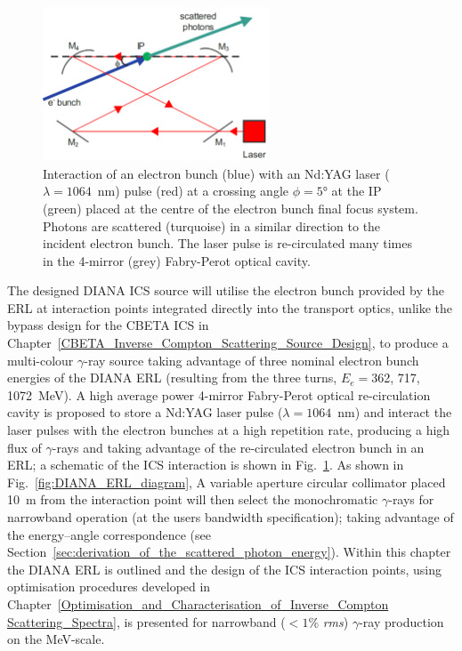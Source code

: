 \documentclass[../main.tex]{subfiles}
\begin{document}
\begin{figure}[!h]
\centering
\includegraphics[width=0.6\textwidth]{Figures/DIANA_Inverse_Compton_Source_Design/DIANA_interaction_fixed.pdf}
\caption{Interaction of an electron bunch (blue) with an Nd:YAG laser ($\lambda = 1064$~\si{\nano\meter}) pulse (red) at a crossing angle $\phi=5$\si{\degree} at the IP (green) placed at the centre of the electron bunch final focus system. Photons are scattered (turquoise) in a similar direction to the incident electron bunch. The laser pulse is re-circulated many times in the 4-mirror (grey) Fabry-Perot optical cavity.    }
\label{fig:DIANA_interaction}
\end{figure}
The designed DIANA ICS source will utilise the electron bunch provided by the ERL at interaction points integrated directly into the transport optics, unlike the bypass design for the CBETA ICS in Chapter~\ref{CBETA_Inverse_Compton_Scattering_Source_Design}, to produce a multi-colour $\gamma$-ray source taking advantage of three nominal electron bunch energies of the DIANA ERL (resulting from the three turns, $E_{e}=$362, 717, 1072~\si{\mega\electronvolt}). A high average power 4-mirror Fabry-Perot optical re-circulation cavity is proposed to store a Nd:YAG laser pulse ($\lambda = 1064$~\si{\nano\meter}) and interact the laser pulses with the electron bunches at a high repetition rate, producing a high flux of $\gamma$-rays and taking advantage of the re-circulated electron bunch in an ERL; a schematic of the ICS interaction is shown in Fig.~\ref{fig:DIANA_interaction}. As shown in Fig.~\ref{fig:DIANA_ERL_diagram}, A variable aperture circular collimator placed 10~\si{\meter} from the interaction point will then select the monochromatic $\gamma$-rays for narrowband operation (at the users bandwidth specification); taking advantage of the energy--angle correspondence (see Section~\ref{sec:derivation_of_the_scattered_photon_energy}). Within this chapter the DIANA ERL is outlined and the design of the ICS interaction points, using optimisation procedures developed in Chapter~\ref{Optimisation_and_Characterisation_of_Inverse_Compton Scattering_Spectra}, is presented for narrowband ($< 1$\% \textit{rms}) $\gamma$-ray production on the \si{\mega\electronvolt}-scale. 
\end{document}
